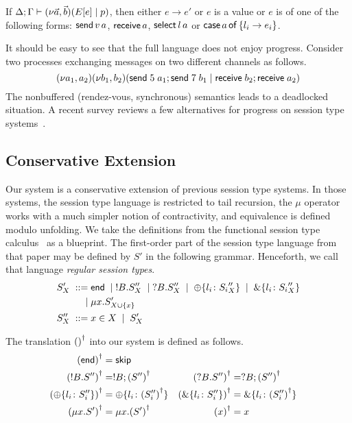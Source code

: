 \begin{corollary}
  If $\Delta;\Gamma \vdash (\nu\vec a,\vec b)(E[e] \mid p)$, then either
  $e\rightarrow e'$ or $e$ is a value or $e$ is of one of the
  following forms: $\mathsf{send}\,{v}\,{a}$, $\mathsf{receive}\,{a}$, $\mathsf{select}{\,{l}\,{a}}$ or
  $\mathsf{case}\,{a}\,\mathsf{of}\,{\{l_i\rightarrow e_i\}}$.  
\end{corollary}

It should be easy to see that the full language does not enjoy
progress. Consider two processes exchanging messages on two
different channels as follows.
%
\begin{equation*}
  (\nu a_1,a_2)(\nu b_1,b_2)(\mathsf{send}\;5\;a_1; \mathsf{send}\;7\;b_1 \mid \mathsf{receive}\;b_2; \mathsf{receive}\;a_2)
\end{equation*}
%
The nonbuffered (rendez-vous, synchronous) semantics leads to a
deadlocked situation. A recent survey reviews a few alternatives for
progress on session type
systems~\cite{huttel.lanese.etal:foundations-session-types}.

\subsection{Conservative Extension}
\label{sec:conservative-extension}

Our system is a conservative extension of previous session type
systems. In those systems, the session type language is restricted to
tail recursion, the $\mu$ operator works with a much simpler notion
of contractivity, and equivalence is defined modulo unfolding.
We take the definitions from the functional session type
calculus~\cite{DBLP:journals/jfp/GayV10} as a blueprint.
The first-order part of the session type language from that paper may
be defined by $S'$ in the following grammar. Henceforth, we call that
language \emph{regular session types}.
\begin{align*}
  S'_X \; ::= \;& \mathsf{end} \;\mid\; !B.S''_X \;\mid\; ?B.S''_X \;\mid\; \oplus\{l_i\colon {S_i}_X''\} \;\mid\;
         \&\{l_i\colon {S_i}_X''\}
  \\
   \;\mid\;& \mu x. S'_{X\cup\{x\}} \\
  S''_X \; ::= \;& x\in X \;\mid\; S'_X
\end{align*}

The translation ${()}^\dagger$ into our system is defined as follows.
\begin{align*}
  {(\mathsf{end})}^\dagger & = \mathsf{skip}
  \\
  {(!B.S'')}^\dagger & = !B; {(S'')}^\dagger
  &
  {(?B.S'')}^\dagger & = ?B; {(S'')}^\dagger
  \\
  {(\oplus\{l_i\colon S_i''\})}^\dagger & = \oplus\{l_i\colon{(S_i'')}^\dagger\}
  &                                      
  {(\&\{l_i\colon S_i''\})}^\dagger & = \&\{l_i\colon  {(S_i'')}^\dagger\}
  \\
  {(\mu x.S')}^\dagger & = \mu x. {(S')}^\dagger
  &
  {(x)}^\dagger & = x
\end{align*}


